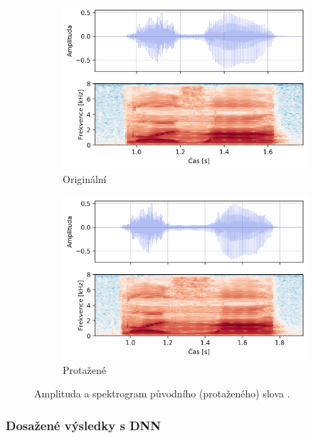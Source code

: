 \begin{figure}[htpb]
  \centering
  \begin{subfigure}[b]{0.42\textwidth}
    \includegraphics[width=\textwidth]{./ch6-realisation/img/energy_spec_word-kosa.png}
    \caption{Originální}
    \label{fig:realisation:augmentation:compare:original}
  \end{subfigure}
  \begin{subfigure}[b]{0.42\textwidth}
    \includegraphics[width=\textwidth]{./ch6-realisation/img/energy_spec_word-kosa_real.png}
    \caption{Protažené}
    \label{fig:realisation:augmentation:compare:augmented}
  \end{subfigure}
  \caption{Amplituda a spektrogram původního (protaženého) slova .}
  \label{fig:realisation:augmentation:compare}
\end{figure}

\subsubsection{Dosažené výsledky s DNN}

